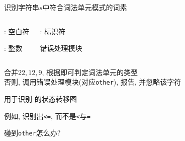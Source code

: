 \begin{frame}{}
  \begin{center}
    识别字符串$s$中符合词法单元模式的词素
  \end{center}

  \begin{columns}
      \begin{center}
        \ws: 空白符

        \vspace{0.20cm}
        \intnum: 整数
      \end{center}
      \begin{center}
        \id: 标识符

        \vspace{0.40cm}
        错误处理模块
      \end{center}
  \end{columns}

  \pause
  \vspace{0.30cm}
  \begin{center}
     合并$22, 12, 9$, 根据即可判定词法单元的类型 \\[8pt]
    否则, 调用错误处理模块(对应\texttt{other}), 报告, 并忽略该字符
  \end{center}
\end{frame}

\begin{frame}{}
  \begin{center}
    用于识别 \blue{\relop} 的状态转移图

    \pause
    \vspace{0.30cm}
     例如, 识别出\texttt{<=}, 而不是\texttt{<}与\texttt{=}

    \pause
    \vspace{0.30cm}
     碰到\texttt{other}怎么办?
  \end{center}
\end{frame}

